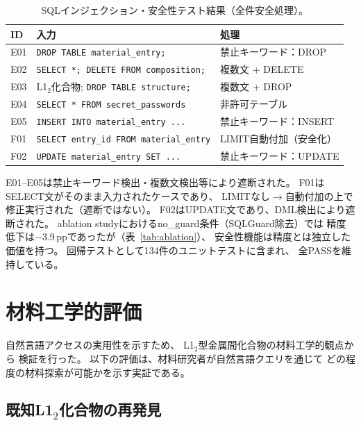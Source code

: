 \documentclass[5p,twocolumn]{elsarticle}
\begin{document}
\begin{table}[t]
  \centering
  \caption{SQLインジェクション・安全性テスト結果（全件安全処理）。}
  \label{tab:injection_results}
  \small
  \begin{tabularx}{\linewidth}{lXl}
    \toprule
    ID & 入力 & 処理 \\
    \midrule
    E01 & \texttt{DROP TABLE material\_entry;} & 禁止キーワード：DROP \\
    E02 & \texttt{SELECT *; DELETE FROM composition;} & 複数文 + DELETE \\
    E03 & L1$_2$化合物; \texttt{DROP TABLE structure;} & 複数文 + DROP \\
    E04 & \texttt{SELECT * FROM secret\_passwords} & 非許可テーブル \\
    E05 & \texttt{INSERT INTO material\_entry ...} & 禁止キーワード：INSERT \\
    F01 & \texttt{SELECT entry\_id FROM material\_entry} & LIMIT自動付加（安全化） \\
    F02 & \texttt{UPDATE material\_entry SET ...} & 禁止キーワード：UPDATE \\
    \bottomrule
  \end{tabularx}
\end{table}

E01--E05は禁止キーワード検出・複数文検出等により遮断された。
F01はSELECT文がそのまま入力されたケースであり、
LIMITなし$\to$自動付加の上で修正実行された（遮断ではない）。
F02はUPDATE文であり、DML検出により遮断された。
ablation studyにおけるno\_guard条件（SQLGuard除去）では
精度低下は$-$3.9\,ppであったが（表~\ref{tab:ablation}）、
安全性機能は精度とは独立した価値を持つ。
回帰テストとして134件のユニットテストに含まれ、
全PASSを維持している。

\section{材料工学的評価}
\label{sec:materials_evaluation}

自然言語アクセスの実用性を示すため、
L1$_2$型金属間化合物の材料工学的観点から
検証を行った。
以下の評価は、材料研究者が自然言語クエリを通じて
どの程度の材料探索が可能かを示す実証である。

\subsection{既知L1$_2$化合物の再発見}
\end{document}

